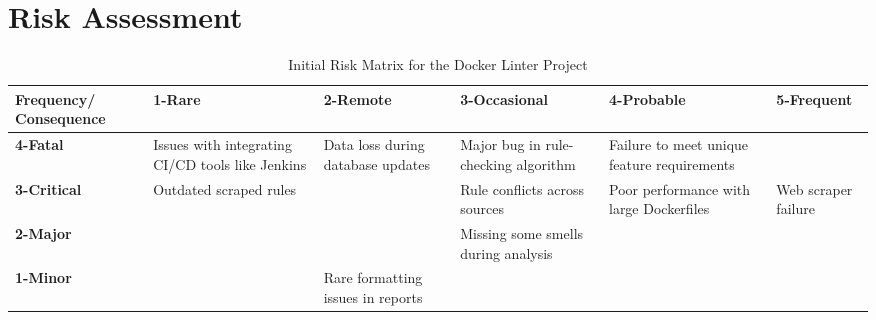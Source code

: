 


\section{Risk Assessment}



\begin{table}[h]
\centering
\scriptsize
\caption{Initial Risk Matrix for the Docker Linter Project}
\begin{tabular}{|p{2cm}|p{2cm}|p{2cm}| p{2cm} |p{2cm}| p{2cm}|}
\hline \bf Frequency/ Consequence & \bf 1-Rare & \bf 2-Remote & \bf 3-Occasional & \bf 4-Probable & \bf 5-Frequent \\ [10pt]

\hline \bf 4-Fatal & \cellcolor{yellow!50} Issues with integrating CI/CD tools like Jenkins & \cellcolor{red!50} Data loss during database updates & \cellcolor{red!50} Major bug in rule-checking algorithm & \cellcolor{red!50} Failure to meet unique feature requirements & \cellcolor{red!50} \\ [10pt]

\hline \bf 3-Critical & \cellcolor{green!50} Outdated scraped rules & \cellcolor{yellow!50}  & \cellcolor{yellow!50} Rule conflicts across sources & \cellcolor{red!50} Poor performance with large Dockerfiles & \cellcolor{red!50} Web scraper failure \\ [10pt]

\hline \bf 2-Major & \cellcolor{green!50}  & \cellcolor{green!50}  & \cellcolor{yellow!50} Missing some smells during analysis & \cellcolor{yellow!50}  & \cellcolor{red!50}  \\ [10pt]

\hline \bf 1-Minor & \cellcolor{green!50} & \cellcolor{green!50} Rare formatting issues in reports & \cellcolor{green!50}  & \cellcolor{yellow!50}  & \cellcolor{yellow!50}  \\ [10pt]
\hline
\end{tabular} \\
\label{tab:ProjRisks}
\end{table}

